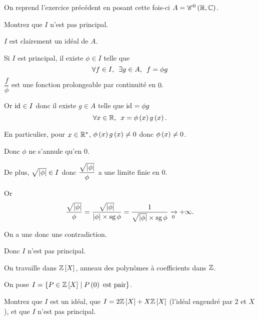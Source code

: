 \begin{exo}
On reprend l'exercice précédent en posant cette fois-ci \(A=\mathscr{C}^{0}\left(\mathbb{R},\mathbb{C}\right)\).

Montrez que \(I\) n'est pas principal.
\end{exo}

\begin{corr}
\(I\) est clairement un idéal de \(A\).

Si \(I\) est principal, il existe \(\phi\in I\) telle que \[\quantifs{\forall f\in I;\exists g\in A}f=\phi g\] \ie \(\dfrac{f}{\phi}\) est une fonction prolongeable par continuité en \(0\).

Or \(\mathrm{id}_{}\in I\) donc il existe \(g\in A\) telle que \(\mathrm{id}_{}=\phi g\) \ie \[\quantifs{\forall x\in\R}x=\phi\paren{x}g\paren{x}.\]

En particulier, pour \(x\in\mathbb{R}^*\), \(\phi\left(x\right)g\left(x\right)\not=0\) donc \(\phi\left(x\right)\not=0\).

Donc \(\phi\) ne s'annule qu'en \(0\).

De plus, \(\sqrt{\left\lvert\phi\right\rvert}\in I\) donc \(\dfrac{\sqrt{\left\lvert\phi\right\rvert}}{\phi}\) a une limite finie en \(0\).

Or \[\dfrac{\sqrt{\left\lvert\phi\right\rvert}}{\phi}=\dfrac{\sqrt{\left\lvert\phi\right\rvert}}{\left\lvert\phi\right\rvert\times\operatorname{sg}\phi}=\dfrac{1}{\sqrt{\left\lvert\phi\right\rvert}\times\operatorname{sg}\phi}\xrightarrow[0]{}+\infty.\]

On a une donc une contradiction.

Donc \(I\) n'est pas principal.
\end{corr}

\begin{exo}
On travaille dans \(\poly[\Z]\), anneau des polynômes à coefficients dans \(\mathbb{Z}\).

On pose \(I=\accol{P\in\poly[\Z]\tq P\paren{0}\text{ est pair}}\).

Montrez que \(I\) est un idéal, que \(I=2\poly[\Z]+X\poly[\Z]\) (\ie l'idéal engendré par \(2\) et \(X\)), et que \(I\) n'est pas principal.
\end{exo}

